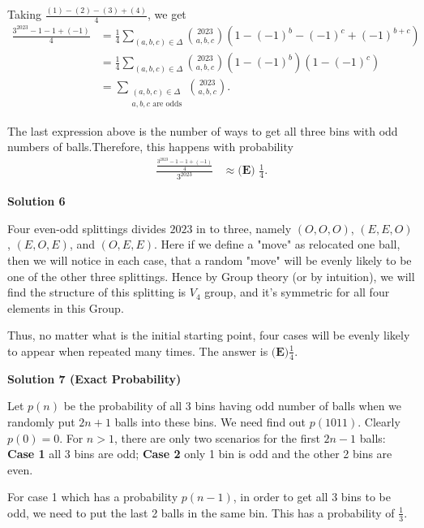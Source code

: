 \begin{enumerate}
 Taking $\frac{(1)-(2) - (3)+(4)}{4}$, we get
 \begin{align*} \frac{3^{2023} - 1 - 1 + (-1)}{4} & = \frac{1}{4} \sum_{(a,b,c) \in \Delta} \binom{2023}{a,b,c}  \left( 1 - (-1)^b - (-1)^c + (-1)^{b+c} \right) \\ & = \frac{1}{4} \sum_{(a,b,c) \in \Delta} \binom{2023}{a,b,c}  \left( 1 - (-1)^b \right) \left( 1 - (-1)^c \right) \\ & = \sum_{\substack{(a,b,c) \in \Delta \\ a, b, c \mbox{ are odds}}} \binom{2023}{a,b,c} . \end{align*}


 The last expression above is the number of ways to get all three bins with odd numbers of balls.Therefore, this happens with probability
 \begin{align*} \frac{\frac{3^{2023} - 1 - 1 + (-1)}{4}}{3^{2023}} & \approx \boxed{\textbf{(E) } \frac{1}{4}}. \end{align*}





\textbf{Solution 6}

Four even-odd splittings divides $2023$ in to three, namely $(O,O,O)$, $(E,E,O)$, $(E,O,E)$, and $(O,E,E)$. Here if we define a "move" as relocated one ball, then we will notice in each case, that a random "move" will be evenly likely to be one of the other three splittings. Hence by Group theory (or by intuition), we will find the structure of this splitting is $V_4$ group, and it's symmetric for all four elements in this Group.

 Thus, no matter what is the initial starting point, four cases will be evenly likely to appear when repeated many times. The answer is $\boxed{\textbf{(E)} \frac{1}{4}}$.

 



\textbf{Solution 7 (Exact Probability)}

Let $p(n)$ be the probability of all 3 bins having odd number of balls when we randomly put $2n+1$ balls into these bins. We need find out $p(1011)$. Clearly $p(0)=0$. For $n>1$, there are only two scenarios for the first $2n-1$ balls: \textbf{Case 1} all 3 bins are odd; \textbf{Case 2} only 1 bin is odd and the other 2 bins are even.

 For case 1 which has a probability $p(n-1)$, in order to get all 3 bins to be odd, we need to put the last 2 balls in the same bin. This has a probability of $\frac{1}{3}$. 


\end{enumerate}
